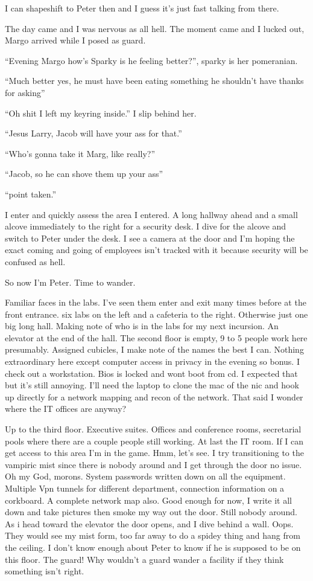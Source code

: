 I can shapeshift to Peter then and I guess it's just fast talking from there.

The day came and I was nervous as all hell. The moment came and I lucked out, Margo arrived while I posed as guard.

``Evening Margo how's Sparky is he feeling better?'', sparky is her pomeranian.

``Much better yes, he must have been eating something he shouldn't have thanks for asking''

``Oh shit I left my keyring inside.'' I slip behind her.

``Jesus Larry, Jacob will have your ass for that.''

``Who's gonna take it Marg, like really?''

``Jacob, so he can shove them up your ass''

``point taken.''

I enter and quickly assess the area I entered. A long hallway ahead and a small alcove immediately to the right for a security desk. I dive for the alcove and switch to Peter under the desk. I see a camera at the door and I'm hoping the exact coming and going of employees isn't tracked with it because security will be confused as hell.

So now I'm Peter. Time to wander.

Familiar faces in the labs. I've seen them enter and exit many times before at the front entrance. six labs on the left and a cafeteria to the right. Otherwise just one big long hall. Making note of who is in the labs for my next incursion. An elevator at the end of the hall. The second floor is empty, 9 to 5 people work here presumably. Assigned cubicles, I make note of the names the best I can. Nothing extraordinary here except computer access in privacy in the evening so bonus. I check out a workstation. Bios is locked and wont boot from cd. I expected that but it's still annoying. I'll need the laptop to clone the mac of the nic and hook up directly for a network mapping and recon of the network. That said I wonder where the IT offices are anyway?

Up to the third floor. Executive suites. Offices and conference rooms, secretarial pools where there are a couple people still working. At last the IT room. If I can get access to this area I'm in the game. Hmm, let's see. I try transitioning to the vampiric mist since there is nobody around and I get through the door no issue. Oh my God, morons. System passwords written down on all the equipment. Multiple Vpn tunnels for different department, connection information on a corkboard. A complete network map also. Good enough for now, I write it all down and take pictures then smoke my way out the door. Still nobody around. As i head toward the elevator the door opens, and I dive behind a wall. Oops. They would see my mist form, too far away to do a spidey thing and hang from the ceiling. I don't know enough about Peter to know if he is supposed to be on this floor. The guard! Why wouldn't a guard wander a facility if they think something isn't right.

